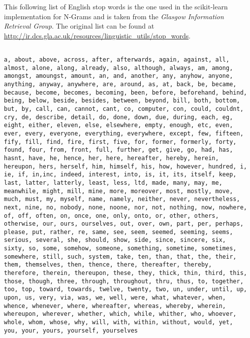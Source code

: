 This following list of English stop words is the one used in the \gls{scikit-learn} implementation for N-Grams and is taken from the \emph{Glasgow Information Retrieval Group}. The original list can be found at \url{http://ir.dcs.gla.ac.uk/resources/linguistic_utils/stop_words}.

\begin{verbatim}

a, about, above, across, after, afterwards, again, against, all,
almost, alone, along, already, also, although, always, am, among,
amongst, amoungst, amount, an, and, another, any, anyhow, anyone,
anything, anyway, anywhere, are, around, as, at, back, be, became,
because, become, becomes, becoming, been, before, beforehand, behind,
being, below, beside, besides, between, beyond, bill, both, bottom,
but, by, call, can, cannot, cant, co, computer, con, could, couldnt,
cry, de, describe, detail, do, done, down, due, during, each, eg,
eight, either, eleven, else, elsewhere, empty, enough, etc, even,
ever, every, everyone, everything, everywhere, except, few, fifteen,
fify, fill, find, fire, first, five, for, former, formerly, forty,
found, four, from, front, full, further, get, give, go, had, has,
hasnt, have, he, hence, her, here, hereafter, hereby, herein,
hereupon, hers, herself, him, himself, his, how, however, hundred, i,
ie, if, in,inc, indeed, interest, into, is, it, its, itself, keep,
last, latter, latterly, least, less, ltd, made, many, may, me,
meanwhile, might, mill, mine, more, moreover, most, mostly, move,
much, must, my, myself, name, namely, neither, never, nevertheless,
next, nine, no, nobody, none, noone, nor, not, nothing, now, nowhere,
of, off, often, on, once, one, only, onto, or, other, others,
otherwise, our, ours, ourselves, out, over, own, part, per, perhaps,
please, put, rather, re, same, see, seem, seemed, seeming, seems,
serious, several, she, should, show, side, since, sincere, six,
sixty, so, some, somehow, someone, something, sometime, sometimes,
somewhere, still, such, system, take, ten, than, that, the, their,
them, themselves, then, thence, there, thereafter, thereby,
therefore, therein, thereupon, these, they, thick, thin, third, this,
those, though, three, through, throughout, thru, thus, to, together,
too, top, toward, towards, twelve, twenty, two, un, under, until, up,
upon, us, very, via, was, we, well, were, what, whatever, when,
whence, whenever, where, whereafter, whereas, whereby, wherein,
whereupon, wherever, whether, which, while, whither, who, whoever,
whole, whom, whose, why, will, with, within, without, would, yet,
you, your, yours, yourself, yourselves

\end{verbatim}

